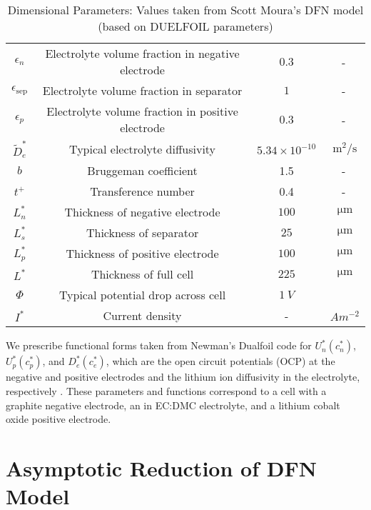 \documentclass[preprint]{elsarticle}
\begin{document}
\begin{table}[h]
{\begin{tabular}{|c|c|c|c|}
        $\epsilon_n$ & Electrolyte volume fraction in negative electrode & $0.3$ & -\\
        $\epsilon_{\text{sep}}$ & Electrolyte volume fraction in separator & $1$ & -\\
        $\epsilon_p$ & Electrolyte volume fraction in positive electrode & $0.3$ & -\\
        $\tilde{D}_e^*$ & Typical electrolyte diffusivity & $5.34\times10^{-10}$ & $\SI{}{\metre^{2}/\second}$ \\
        $b$ & Bruggeman coefficient & 1.5 & - \\
        $t^+$ & Transference number & 0.4 & - \\
        $L_n^*$ & Thickness of negative electrode &$100$ & $\SI{}{\micro\metre}$  \\
        $L_{s}^*$ & Thickness of separator &$25$ & $\SI{}{\micro\metre}$ \\
        $L_p^*$ & Thickness of positive electrode &$100$ & $\SI{}{\micro\metre}$  \\ 
        $L^*$ & Thickness of full cell & $225$ & $\SI{}{\micro\metre}$ \\
        $\Phi$ & Typical potential drop across cell & $\SI{1}{V}$ \\
        $I^*$ & Current density & - & $\SI{}{A m^{-2}}$ \\ \hline
    \end{tabular}}
    \caption{Dimensional Parameters: Values taken from Scott Moura's DFN model (based on DUELFOIL parameters)} \label{tab:dimensional}
\end{table}

We prescribe functional forms taken from Newman's Dualfoil code for $U_n^*(c_n^*)$, $U_p^*(c_p^*)$, and $D_e^*(c_e^*)$, which are the open circuit potentials (OCP) at the negative and positive electrodes and the lithium ion diffusivity in the electrolyte, respectively \cite{newman2004fortran}. These parameters and functions correspond to a cell with a graphite negative electrode, an  in EC:DMC electrolyte, and a lithium cobalt oxide positive electrode.

\section{Asymptotic Reduction of DFN Model}
\end{document}
